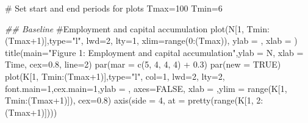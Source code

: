 \documentclass[
  letterpaper,
  DIV=11,
  numbers=noendperiod]{scrreprt}
\newenvironment{Shaded}{\begin{snugshade}}{\end{snugshade}}
\newcommand{\AttributeTok}[1]{\textcolor[rgb]{0.40,0.45,0.13}{#1}}
\newcommand{\CommentTok}[1]{\textcolor[rgb]{0.37,0.37,0.37}{#1}}
\newcommand{\ConstantTok}[1]{\textcolor[rgb]{0.56,0.35,0.01}{#1}}
\newcommand{\DecValTok}[1]{\textcolor[rgb]{0.68,0.00,0.00}{#1}}
\newcommand{\DocumentationTok}[1]{\textcolor[rgb]{0.37,0.37,0.37}{\textit{#1}}}
\newcommand{\FloatTok}[1]{\textcolor[rgb]{0.68,0.00,0.00}{#1}}
\newcommand{\FunctionTok}[1]{\textcolor[rgb]{0.28,0.35,0.67}{#1}}
\newcommand{\NormalTok}[1]{\textcolor[rgb]{0.00,0.23,0.31}{#1}}
\newcommand{\OtherTok}[1]{\textcolor[rgb]{0.00,0.23,0.31}{#1}}
\newcommand{\SpecialCharTok}[1]{\textcolor[rgb]{0.37,0.37,0.37}{#1}}
\newcommand{\StringTok}[1]{\textcolor[rgb]{0.13,0.47,0.30}{#1}}
\begin{document}
\begin{Shaded}
\begin{Highlighting}[]
\CommentTok{\# Set start and end periods for plots}
\NormalTok{Tmax}\OtherTok{=}\DecValTok{100}
\NormalTok{Tmin}\OtherTok{=}\DecValTok{6}

\DocumentationTok{\#\# Baseline}
\CommentTok{\#Employment and capital accumulation}
\FunctionTok{plot}\NormalTok{(N[}\DecValTok{1}\NormalTok{, Tmin}\SpecialCharTok{:}\NormalTok{(Tmax}\SpecialCharTok{+}\DecValTok{1}\NormalTok{)],}\AttributeTok{type=}\StringTok{"l"}\NormalTok{, }\AttributeTok{lwd=}\DecValTok{2}\NormalTok{, }\AttributeTok{lty=}\DecValTok{1}\NormalTok{, }\AttributeTok{xlim=}\FunctionTok{range}\NormalTok{(}\DecValTok{0}\SpecialCharTok{:}\NormalTok{(Tmax)), }\AttributeTok{ylab =} \StringTok{\textquotesingle{}\textquotesingle{}}\NormalTok{, }\AttributeTok{xlab =} \StringTok{\textquotesingle{}\textquotesingle{}}\NormalTok{)}
\FunctionTok{title}\NormalTok{(}\AttributeTok{main=}\StringTok{"Figure 1: Employment and capital accumulation"}\NormalTok{,}\AttributeTok{ylab =} \StringTok{\textquotesingle{}N\textquotesingle{}}\NormalTok{, }\AttributeTok{xlab =} \StringTok{\textquotesingle{}Time\textquotesingle{}}\NormalTok{, }\AttributeTok{cex=}\FloatTok{0.8}\NormalTok{, }\AttributeTok{line=}\DecValTok{2}\NormalTok{)}
\FunctionTok{par}\NormalTok{(}\AttributeTok{mar =} \FunctionTok{c}\NormalTok{(}\DecValTok{5}\NormalTok{, }\DecValTok{4}\NormalTok{, }\DecValTok{4}\NormalTok{, }\DecValTok{4}\NormalTok{) }\SpecialCharTok{+} \FloatTok{0.3}\NormalTok{)}
\FunctionTok{par}\NormalTok{(}\AttributeTok{new =} \ConstantTok{TRUE}\NormalTok{)}
\FunctionTok{plot}\NormalTok{(K[}\DecValTok{1}\NormalTok{, Tmin}\SpecialCharTok{:}\NormalTok{(Tmax}\SpecialCharTok{+}\DecValTok{1}\NormalTok{)],}\AttributeTok{type=}\StringTok{"l"}\NormalTok{, }\AttributeTok{col=}\DecValTok{1}\NormalTok{, }\AttributeTok{lwd=}\DecValTok{2}\NormalTok{, }\AttributeTok{lty=}\DecValTok{2}\NormalTok{, }\AttributeTok{font.main=}\DecValTok{1}\NormalTok{,}\AttributeTok{cex.main=}\DecValTok{1}\NormalTok{,}\AttributeTok{ylab =} \StringTok{\textquotesingle{}\textquotesingle{}}\NormalTok{, }\AttributeTok{axes=}\ConstantTok{FALSE}\NormalTok{,}
     \AttributeTok{xlab =} \StringTok{\textquotesingle{}\textquotesingle{}}\NormalTok{,}\AttributeTok{ylim =} \FunctionTok{range}\NormalTok{(K[}\DecValTok{1}\NormalTok{, Tmin}\SpecialCharTok{:}\NormalTok{(Tmax}\SpecialCharTok{+}\DecValTok{1}\NormalTok{)]), }\AttributeTok{cex=}\FloatTok{0.8}\NormalTok{)}
\FunctionTok{axis}\NormalTok{(}\AttributeTok{side =} \DecValTok{4}\NormalTok{, }\AttributeTok{at =} \FunctionTok{pretty}\NormalTok{(}\FunctionTok{range}\NormalTok{(K[}\DecValTok{1}\NormalTok{, }\DecValTok{2}\SpecialCharTok{:}\NormalTok{(Tmax}\SpecialCharTok{+}\DecValTok{1}\NormalTok{)])))  }

\end{Highlighting}
\end{Shaded}
\end{document}
